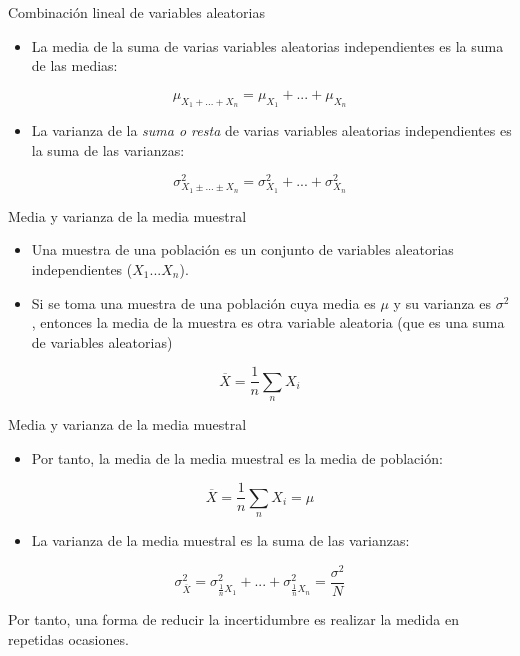 \documentclass[xcolor={usenames,svgnames,dvipsnames}]{beamer}
\begin{document}
\begin{frame}[label={sec:orge5db18b}]{Combinación lineal de variables aleatorias}
\begin{itemize}
\item La \alert{media de la suma} de varias variables aleatorias \alert{independientes} es
la suma de las medias:
\end{itemize}
\[
\mu_{X_{1}+...+X_{n}}=\mu_{X_{1}}+...+\mu_{X_{n}}
\]

\begin{itemize}
\item La \alert{varianza de la \emph{suma o resta}} de varias variables aleatorias
\alert{independientes} es la \alert{suma} de las varianzas:
\end{itemize}

\[
\sigma_{X_{1}\pm...\pm X_{n}}^{2}=\sigma_{X_{1}}^{2}+...+\sigma_{X_{n}}^{2}
\]
\end{frame}



\begin{frame}[label={sec:orga8752eb}]{Media y varianza de la media muestral}
\begin{itemize}
\item Una \alert{muestra de una población} es un conjunto de variables
aleatorias independientes (\(X_{1}...X_{n}\)).

\item Si se toma una muestra de una población cuya media es \(\mu\) y su
varianza es \(\sigma^{2}\), entonces la media de la muestra es otra
variable aleatoria (que es una suma de variables aleatorias)
\end{itemize}

\[
\overline{X}=\frac{1}{n}\sum_{n}X_{i}
\]
\end{frame}



\begin{frame}[label={sec:org8f22ba3}]{Media y varianza de la media muestral}
\begin{itemize}
\item Por tanto, la \alert{media de la media muestral} es la media de población:
\end{itemize}
\[
\overline{X}=\frac{1}{n}\sum_{n}X_{i} = \mu
\]

\begin{itemize}
\item La \alert{varianza de la media muestral} es la suma de las varianzas:
\end{itemize}

\[
\sigma_{\overline{X}}^{2}=\sigma_{\frac{1}{n}X_{1}}^{2}+...+\sigma_{\frac{1}{n}X_{n}}^{2}=\frac{\sigma^2}{N}
\]

\begin{block}{}
Por tanto, una forma de \alert{reducir la incertidumbre} es realizar la
\alert{medida en repetidas ocasiones}.
\end{block}
\end{frame}
\end{document}
